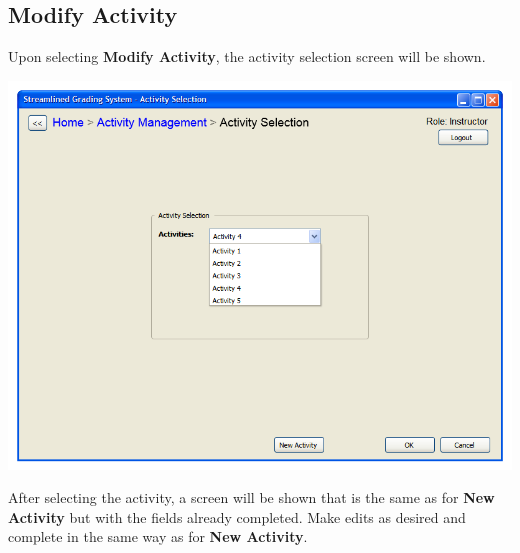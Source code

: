 \documentclass{article}
\begin{document}
\subsection{Modify Activity}
Upon selecting \textbf{Modify Activity}, the activity selection screen will be shown.
  \begin{center} 
     \includegraphics[scale=0.55]{../images/UIMockups/pngs/ActivitySelectionAM}
     \label{actSel}
  \end{center} 
  After selecting the activity, a screen will be shown that is the same as for 
  \textbf{New Activity} but with the fields already completed. Make edits as
  desired and complete in the same way as for \textbf{New Activity}.
\end{document}
